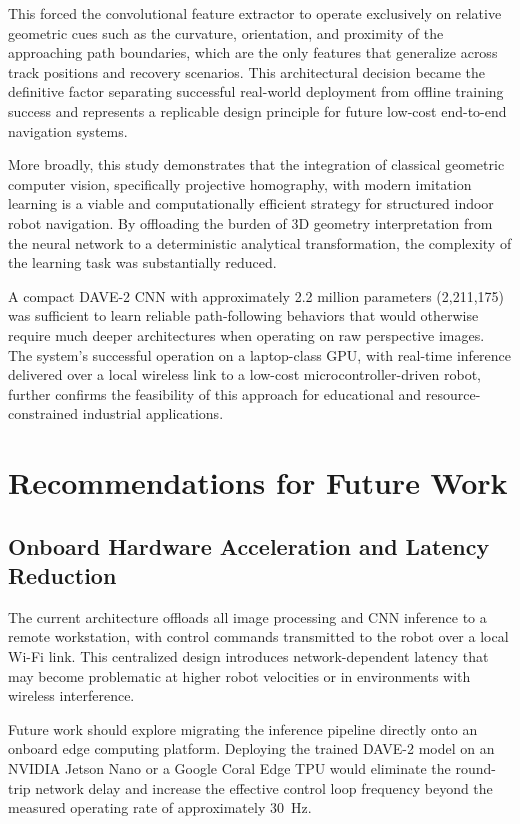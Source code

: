 This forced the convolutional feature extractor to operate exclusively on relative geometric cues such as the curvature, orientation, and proximity of the approaching path boundaries, which are the only features that generalize across track positions and recovery scenarios. This architectural decision became the definitive factor separating successful real-world deployment from offline training success and represents a replicable design principle for future low-cost end-to-end navigation systems.

More broadly, this study demonstrates that the integration of classical geometric computer vision, specifically projective homography, with modern imitation learning is a viable and computationally efficient strategy for structured indoor robot navigation. By offloading the burden of 3D geometry interpretation from the neural network to a deterministic analytical transformation, the complexity of the learning task was substantially reduced.

A compact DAVE-2 CNN with approximately 2.2 million parameters (2{,}211{,}175) was sufficient to learn reliable path-following behaviors that would otherwise require much deeper architectures when operating on raw perspective images. The system's successful operation on a laptop-class GPU, with real-time inference delivered over a local wireless link to a low-cost microcontroller-driven robot, further confirms the feasibility of this approach for educational and resource-constrained industrial applications.

\section{Recommendations for Future Work}

\subsection{Onboard Hardware Acceleration and Latency Reduction}

The current architecture offloads all image processing and CNN inference to a remote workstation, with control commands transmitted to the robot over a local Wi-Fi link. This centralized design introduces network-dependent latency that may become problematic at higher robot velocities or in environments with wireless interference.

Future work should explore migrating the inference pipeline directly onto an onboard edge computing platform. Deploying the trained DAVE-2 model on an NVIDIA Jetson Nano or a Google Coral Edge TPU would eliminate the round-trip network delay and increase the effective control loop frequency beyond the measured operating rate of approximately 30~Hz.


